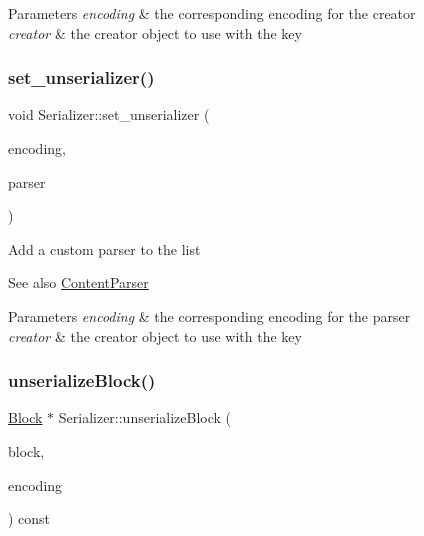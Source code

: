 \begin{DoxyParams}{Parameters}
{\em encoding} & the corresponding encoding for the creator \\
\hline
{\em creator} & the creator object to use with the key \\
\hline
\end{DoxyParams}
\mbox{\label{classSerializer_adf32dca6325e4a613c4c7ba48a3de244}} 
\subsubsection{\texorpdfstring{set\+\_\+unserializer()}{set\_unserializer()}}
{\footnotesize\ttfamily void Serializer\+::set\+\_\+unserializer (\begin{DoxyParamCaption}\item[{const char $\ast$}]{encoding,  }\item[{\mbox{\hyperlink{classContentParser}{Content\+Parser}} $\ast$}]{parser }\end{DoxyParamCaption})}

Add a custom parser to the list \begin{DoxySeeAlso}{See also}
\mbox{\hyperlink{classContentParser}{Content\+Parser}}
\end{DoxySeeAlso}

\begin{DoxyParams}{Parameters}
{\em encoding} & the corresponding encoding for the parser \\
\hline
{\em creator} & the creator object to use with the key \\
\hline
\end{DoxyParams}
\mbox{\label{classSerializer_a423fb7c43ca9c23e07000dba0c5a432a}} 
\subsubsection{\texorpdfstring{unserialize\+Block()}{unserializeBlock()}}
{\footnotesize\ttfamily \mbox{\hyperlink{classBlock}{Block}} $\ast$ Serializer\+::unserialize\+Block (\begin{DoxyParamCaption}\item[{std\+::string}]{block,  }\item[{const char $\ast$}]{encoding }\end{DoxyParamCaption}) const\hspace{0.3cm}{\ttfamily [virtual]}}

